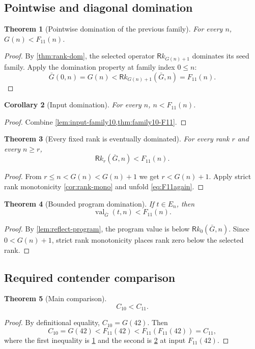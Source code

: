 \documentclass[11pt,oneside]{article}
\newtheorem{theorem}{Theorem}[section]
\newtheorem{corollary}[theorem]{Corollary}
\theoremstyle{definition}
\newcommand{\Ram}{\mathsf Rk}
\begin{document}
\subsection{Pointwise and diagonal domination}

\begin{theorem}[Pointwise domination of the previous family]
\label{thm:family10-F11}
For every $n$, $G(n)<F_{11}(n)$.
\end{theorem}
\begin{proof}
By \cref{thm:rank-dom}, the selected operator
$\Ram_{G(n)+1}$ dominates its seed family.  Apply the domination property at
family index $0\le n$:
\[
 \bar G(0,n)=G(n)<\Ram_{G(n)+1}(\bar G,n)=F_{11}(n).
\]
\end{proof}

\begin{corollary}[Input domination]\label{cor:input-F11}
For every $n$, $n<F_{11}(n)$.
\end{corollary}
\begin{proof}
Combine \cref{lem:input-family10,thm:family10-F11}.
\end{proof}

\begin{theorem}[Every fixed rank is eventually dominated]
\label{thm:fixed-rank}
For every rank $r$ and every $n\ge r$,
\[
 \Ram_r(\bar G,n)<F_{11}(n).
\]
\end{theorem}
\begin{proof}
From $r\le n<G(n)<G(n)+1$ we get $r<G(n)+1$.  Apply strict rank monotonicity
\cref{cor:rank-mono} and unfold \cref{eq:F11again}.
\end{proof}

\begin{theorem}[Bounded program domination]\label{thm:program-F11}
If $t\in E_n$, then
\[
 \operatorname{val}_{\bar G}(t,n)<F_{11}(n).
\]
\end{theorem}
\begin{proof}
By \cref{lem:reflect-program}, the program value is below
$\Ram_0(\bar G,n)$.  Since $0<G(n)+1$, strict rank monotonicity places rank
zero below the selected rank.
\end{proof}

\subsection{Required contender comparison}

\begin{theorem}[Main comparison]\label{thm:main}
\[
 C_{10}<C_{11}.
\]
\end{theorem}
\begin{proof}
By definitional equality, $C_{10}=G(42)$.  Then
\[
 C_{10}=G(42)
   <F_{11}(42)
   <F_{11}(F_{11}(42))=C_{11},
\]
where the first inequality is \cref{thm:family10-F11} and the second is
\cref{cor:input-F11} at input $F_{11}(42)$.
\end{proof}
\end{document}
